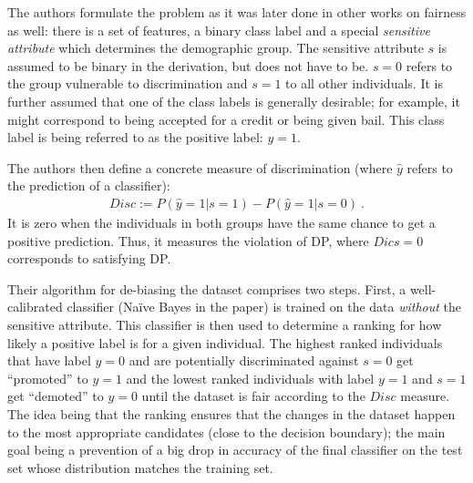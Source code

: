 The authors formulate the problem as it was later done in other works on fairness as well:
there is a set of features, a binary class label
and a special \emph{sensitive attribute} which determines the demographic group.
The sensitive attribute \(s\) is assumed to be binary in the derivation,
but does not have to be.
\(s=0\) refers to the group vulnerable to discrimination and \(s=1\) to all other individuals.
It is further assumed that one of the class labels is generally desirable;
for example, it might correspond to being accepted for a credit or being given bail.
This class label is being referred to as the positive label: \(y = 1\).

The authors then define a concrete measure of discrimination (where $\hat{y}$ refers to the prediction of a classifier):
\begin{align}
  \label{eq:disc}
  Disc := P(\hat{y}=1|s =1) - P(\hat{y}=1|s = 0)~.
\end{align}
It is zero when the individuals in both groups have the same chance to get a positive prediction.
Thus, it measures the violation of \ac{DP}, where $Dics=0$ corresponds to satisfying \ac{DP}.

Their algorithm for de-biasing the dataset comprises two steps.
First, a well-calibrated classifier (Na\"ive Bayes in the paper) is trained on the data
\emph{without} the sensitive attribute.
This classifier is then used to determine a ranking for how likely a positive label is for a given individual.
The highest ranked individuals that have label \(y=0\)
and are potentially discriminated against \(s=0\) get ``promoted'' to \(y=1\)
and the lowest ranked individuals with label \(y=1\) and \(s=1\) get ``demoted'' to \(y=0\)
until the dataset is fair according to the \(Disc\) measure.
The idea being that the ranking ensures that the changes in the dataset
happen to the most appropriate candidates (close to the decision boundary);
the main goal being a prevention of a big drop in accuracy of the final classifier
on the test set whose distribution matches the training set.


